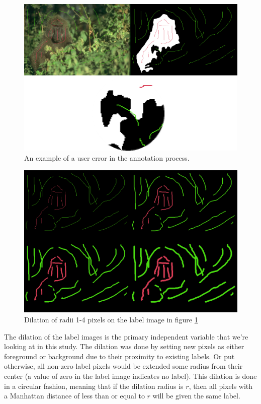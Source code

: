 \documentclass[12pt,a4paper,notitlepage]{article}
\begin{document}
\begin{figure}[h]
	\includegraphics[width=\linewidth]{dilation_error_example}
	\caption{An example of a user error in the annotation process.}
	\label{fig:dilation_error_example}
\end{figure}

\begin{figure}[h]
	\includegraphics[width=\linewidth]{dilate_example_all}
	\caption{Dilation of radii 1-4 pixels on the label image in figure \ref{fig:dilation_error_example}}
	\label{fig:dilate_example_all}
\end{figure}

The dilation of the label images is the primary independent variable that we're looking at in this study. The dilation was done by setting new pixels as either foreground or background due to their proximity to existing labels. Or put otherwise, all non-zero label pixels would be extended some radius from their center (a value of zero in the label image indicates no label). This dilation is done in a circular fashion, meaning that if the dilation radius is $r$, then all pixels with a Manhattan distance of less than or equal to $r$ will be given the same label.
\end{document}
